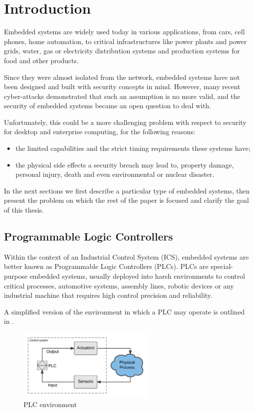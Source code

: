 \chapter{Introduction}
\label{chap:intro}

Embedded systems are widely used today in various applications, from cars, cell phones, home automation, to critical infrastructures
like power plants and power grids, water, gas or electricity distribution systems and production systems for food and other products.

Since they were almost isolated from the network, embedded systems have not been designed and built with security concepts in mind.
However, many recent cyber-attacks demonstrated that such an assumption is no more valid, and the security of embedded systems became an open question to deal with.

Unfortunately, this could be a more challenging problem with respect to security for desktop and enterprise computing, for the following reasons:
\begin{itemize}[itemsep=2pt,topsep=0pt]
	\item the limited capabilities and the strict timing requirements these systems have;
	\item the physical side effects a security breach may lead to, \eg property damage, personal injury, death and even environmental or nuclear disaster.
\end{itemize}

In the next sections we first describe a particular type of embedded systems, then present the problem on which the rest of the paper is focused
and clarify the goal of this thesis.


\section{Programmable Logic Controllers}

Within the context of an Industrial Control System (ICS), embedded systems are better known as Programmable Logic Controllers (PLCs).
PLCs are special-purpose embedded systems, usually deployed into harsh environments to control critical processes,
\eg automotive systems, assembly lines, robotic devices or any industrial machine that requires high control precision and reliability.

A simplified version of the environment in which a PLC may operate is outlined in .
\begin{figure}[h]
\centerline{\includegraphics[width=0.6\textwidth]{res/plc_env}}
\caption{PLC environment\label{fig:plc_env}}
\end{figure}

